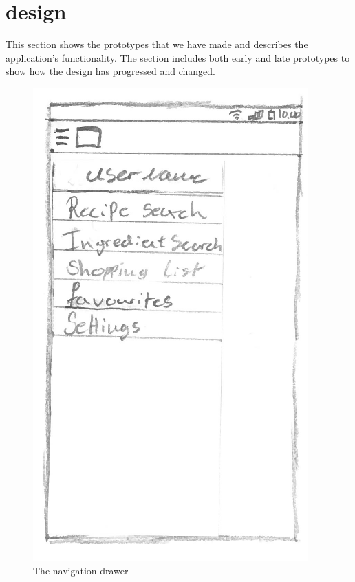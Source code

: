 \section{design}

This section shows the prototypes that we have made and describes the application's functionality. The section includes both early and late prototypes to show how the design has progressed and changed. 


\begin{figure}[H]
\begin{minipage}[b]{0.5\columnwidth}
\centering
\includegraphics[width=0.7\columnwidth]{img/prototypes/navigation_drawer.pdf}
\caption{The navigation drawer\label{fig:navdrawer}}
\end{minipage}
\hspace{0.5cm}
\begin{minipage}[b]{0.5\columnwidth}
\centering

\end{minipage}
\end{figure}
